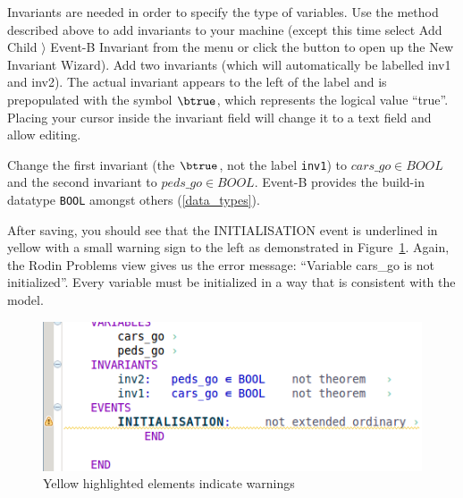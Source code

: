 Invariants are needed in order to specify the type of variables. Use the method described above to add invariants to your machine (except this time select \textsf{Add Child $\rangle$ Event-B Invariant} from the menu or click the  button to open up the New Invariant Wizard). Add two invariants (which will automatically be labelled \textsf{inv1} and \textsf{inv2}). The actual invariant appears to the left of the label and is prepopulated with the symbol $\btrue$, which represents the logical value ``true''. Placing your cursor inside the invariant field will change it to a text field and allow editing. 

Change the first invariant (the $\btrue$, not the label \texttt{inv1}) to $cars\_go \in  BOOL$ and the second invariant to $peds\_go \in  BOOL$.
Event-B provides the build-in datatype \texttt{BOOL} amongst others (\ref{data_types}).



After saving, you should see that the \textsf{INITIALISATION} event is underlined in yellow with a small warning sign to the left as demonstrated in Figure~\ref{fig_tut_03_warning}. Again, the \textsf{Rodin Problems} view gives us the error message: ``Variable cars\_go is not initialized''. Every variable must be initialized in a way that is consistent with the model.

\begin{figure}[!ht]
\begin{center}
	\includegraphics[]{img/tutorial/tut_03_yellow_neweditor.png}
	\caption{Yellow highlighted elements indicate warnings}
	\label{fig_tut_03_warning}
\end{center}
\end{figure}

